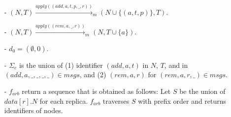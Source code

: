 {\begin{itemize}
\item[-] $(N,T) \xrightarrow{\mathit{apply}((\mathit{add},a,t,p,\_,r))}_m (N \cup \{ (a,t,p) \},T)$.

\item[-] $(N,T) \xrightarrow{\mathit{apply}((\mathit{rem},a,\_,r))}_m (N,T \cup \{ a \})$.

\item[-] $d_0 = (\emptyset,0)$.

\item[-] $\Sigma_e$ is the union of (1) identifier $(\mathit{add},a,t)$ in $N$, $T$, and in $(\mathit{add},a,\_,\_,\_,\_) \in \mathit{msgs}$, and (2) $(\mathit{rem},a,r)$ for $(\mathit{rem},a,r,\_) \in \mathit{msgs}$.
\item[-] $f_{\mathit{arb}}$ return a sequence that is obtained as follows: Let $S$ be the union of $\mathit{data}[r].N$ for each replica. $f_{\mathit{arb}}$ traverses $S$ with prefix order and returns identifiers of nodes.
\end{itemize}
}





























